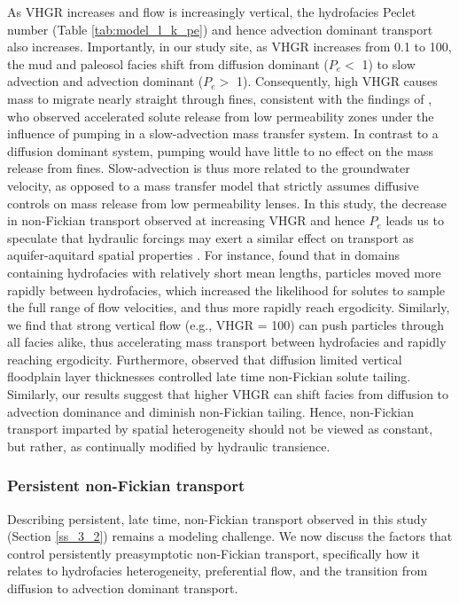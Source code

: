 As VHGR increases and flow is increasingly vertical, the hydrofacies Peclet number (Table \ref{tab:model_l_k_pe}) and hence advection dominant transport also increases. Importantly, in our study site, as VHGR increases from 0.1 to 100, the mud and paleosol facies shift from diffusion dominant ($P_e < $ 1) to slow advection and advection dominant ($P_e > $ 1). Consequently, high VHGR causes mass to migrate nearly straight through fines, consistent with the findings of \citet{guswa2000slow}, who observed accelerated solute release from low permeability zones under the influence of pumping in a slow-advection mass transfer system. In contrast to a diffusion dominant system, pumping would have little to no effect on the mass release from fines. Slow-advection is thus more related to the groundwater velocity, as opposed to a mass transfer model that strictly assumes diffusive controls on mass release from low permeability lenses. In this study, the decrease in non-Fickian transport observed at increasing VHGR and hence $P_e$ leads us to speculate that hydraulic forcings may exert a similar effect on transport as aquifer-aquitard spatial properties \citep[e.g.][]{zhang2006nonpoint, zhang2007predicting, yin2020super, zhang2013impact}. For instance, \citet{zhang2013impact} found that in domains containing hydrofacies with relatively short mean lengths, particles moved more rapidly between hydrofacies, which increased the likelihood for solutes to sample the full range of flow velocities, and thus more rapidly reach ergodicity. Similarly, we find that strong vertical flow (e.g., VHGR = 100) can push particles through all facies alike, thus accelerating mass transport between hydrofacies and rapidly reaching ergodicity. Furthermore, \citet{zhang2007predicting, zhang2013impact} observed that diffusion limited vertical floodplain layer thicknesses controlled late time non-Fickian solute tailing. Similarly, our results suggest that higher VHGR can shift facies from diffusion to advection dominance and diminish non-Fickian tailing. Hence, non-Fickian transport imparted by spatial heterogeneity should not be viewed as constant, but rather, as continually modified by hydraulic transience.

%
\subsubsection{Persistent non-Fickian transport}
\label{ss_4_2_3}

Describing persistent, late time, non-Fickian transport observed in this study (Section \ref{ss_3_2}) remains a modeling challenge. We now discuss the factors that control persistently preasymptotic non-Fickian transport, specifically how it relates to hydrofacies heterogeneity, preferential flow, and the transition from diffusion to advection dominant transport.

